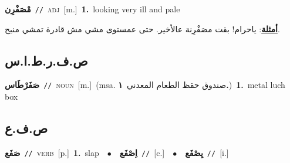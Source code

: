 \documentclass[10pt,a4paper,twoside]{article} %
\begin{document}
\begin{multicols}{2}
{\setlength\topsep{0pt}\textbf{\foreignlanguage{arabic}{مْصَفْرِن}}\ {\color{gray}\texttt{//}\color{black}}\ \textsc{adj}\ [m.]\ \textbf{1.}~looking very ill and pale\  \begin{flushright}\color{gray}\foreignlanguage{arabic}{\textbf{\underline{\foreignlanguage{arabic}{أمثلة}}}: ياحرام! بقت مصَفْرِنة عالأخير. حتى عمستوى مشي مش قادرة تمشي منيح.}\end{flushright}\color{black}} \vspace{2mm}

\vspace{-3mm}
\subsection*{\color{blue}\foreignlanguage{arabic}{ص.ف.ر.ط.ا.س}\color{blue}{ (ntws)}} 

{\setlength\topsep{0pt}\textbf{\foreignlanguage{arabic}{صَفَرْطَاس}}\ {\color{gray}\texttt{//}\color{black}}\ \textsc{noun}\ [m.]\ \color{gray}(msa. \foreignlanguage{arabic}{صندوق حقظ الطعام المعدني}~\foreignlanguage{arabic}{\textbf{١.}})\color{black}\ \textbf{1.}~metal luch box\ } \vspace{2mm}

\vspace{-3mm}
\subsection*{\color{blue}\foreignlanguage{arabic}{ص.ف.ع}\color{blue}{}} 

{\setlength\topsep{0pt}\textbf{\foreignlanguage{arabic}{صَفَع}}\ {\color{gray}\texttt{//}\color{black}}\ \textsc{verb}\ [p.]\ \textbf{1.}~slap\ \ $\bullet$\ \ \setlength\topsep{0pt}\textbf{\foreignlanguage{arabic}{اِصْفَع}}\ {\color{gray}\texttt{//}\color{black}}\ [c.]\ \ $\bullet$\ \ \setlength\topsep{0pt}\textbf{\foreignlanguage{arabic}{يِصْفَع}}\ {\color{gray}\texttt{//}\color{black}}\ [i.]\ } \vspace{2mm}


\end{multicols}
\end{document}
